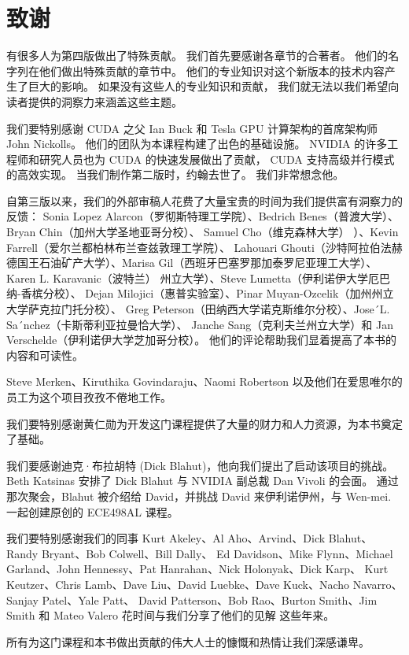\section*{致谢}
有很多人为第四版做出了特殊贡献。 我们首先要感谢各章节的合著者。 他们的名字列在他们做出特殊贡献的章节中。 
他们的专业知识对这个新版本的技术内容产生了巨大的影响。 如果没有这些人的专业知识和贡献，
我们就无法以我们希望向读者提供的洞察力来涵盖这些主题。

我们要特别感谢 CUDA 之父 Ian Buck 和 Tesla GPU 计算架构的首席架构师 John Nickolls。 
他们的团队为本课程构建了出色的基础设施。 NVIDIA 的许多工程师和研究人员也为 CUDA 的快速发展做出了贡献，
CUDA 支持高级并行模式的高效实现。 当我们制作第二版时，约翰去世了。 我们非常想念他。

自第三版以来，我们的外部审稿人花费了大量宝贵的时间为我们提供富有洞察力的反馈：
Sonia Lopez Alarcon（罗彻斯特理工学院）、Bedrich Benes（普渡大学）、Bryan Chin（加州大学圣地亚哥分校）、
Samuel Cho（维克森林大学） ）、Kevin Farrell（爱尔兰都柏林布兰查兹敦理工学院）、
Lahouari Ghouti（沙特阿拉伯法赫德国王石油矿产大学）、Marisa Gil（西班牙巴塞罗那加泰罗尼亚理工大学）、
Karen L. Karavanic（波特兰） 州立大学）、Steve Lumetta（伊利诺伊大学厄巴纳-香槟分校）、
Dejan Milojici（惠普实验室）、Pinar Muyan-Ozcelik（加州州立大学萨克拉门托分校）、
Greg Peterson（田纳西大学诺克斯维尔分校）、Jose´L. Sa´nchez（卡斯蒂利亚拉曼恰大学）、
Janche Sang（克利夫兰州立大学）和 Jan Verschelde（伊利诺伊大学芝加哥分校）。 
他们的评论帮助我们显着提高了本书的内容和可读性。

Steve Merken、Kiruthika Govindaraju、Naomi Robertson 以及他们在爱思唯尔的员工为这个项目孜孜不倦地工作。

我们要特别感谢黄仁勋为开发这门课程提供了大量的财力和人力资源，为本书奠定了基础。

我们要感谢迪克·布拉胡特 (Dick Blahut)，他向我们提出了启动该项目的挑战。 
Beth Katsinas 安排了 Dick Blahut 与 NVIDIA 副总裁 Dan Vivoli 的会面。 
通过那次聚会，Blahut 被介绍给 David，并挑战 David 来伊利诺伊州，与 Wen-mei. 一起创建原创的 ECE498AL 课程。

我们要特别感谢我们的同事 Kurt Akeley、Al Aho、Arvind、Dick Blahut、Randy Bryant、Bob Colwell、Bill Dally、
Ed Davidson、Mike Flynn、Michael Garland、John Hennessy、Pat Hanrahan、Nick Holonyak、Dick Karp、
Kurt Keutzer、Chris Lamb、Dave Liu、David Luebke、Dave Kuck、Nacho Navarro、Sanjay Patel、Yale Patt、
David Patterson、Bob Rao、Burton Smith、Jim Smith 和 Mateo Valero 花时间与我们分享了他们的见解 这些年来。

所有为这门课程和本书做出贡献的伟大人士的慷慨和热情让我们深感谦卑。
